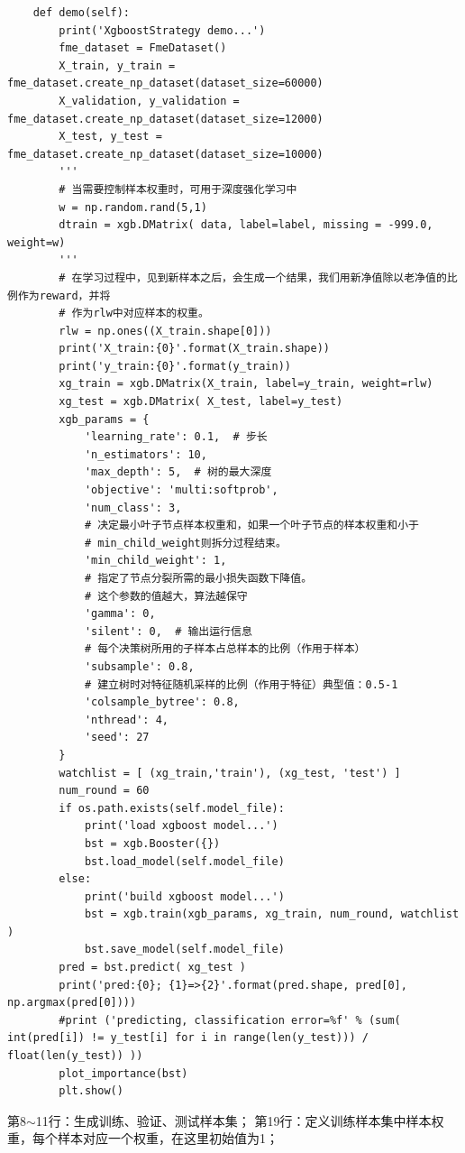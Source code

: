 \documentclass{article}
\begin{document}
\begin{lstlisting}
    def demo(self):
        print('XgboostStrategy demo...')
        fme_dataset = FmeDataset()
        X_train, y_train = fme_dataset.create_np_dataset(dataset_size=60000)
        X_validation, y_validation = fme_dataset.create_np_dataset(dataset_size=12000)
        X_test, y_test = fme_dataset.create_np_dataset(dataset_size=10000)
        '''
        # 当需要控制样本权重时，可用于深度强化学习中
        w = np.random.rand(5,1)
        dtrain = xgb.DMatrix( data, label=label, missing = -999.0, weight=w)
        '''
        # 在学习过程中，见到新样本之后，会生成一个结果，我们用新净值除以老净值的比例作为reward，并将
        # 作为rlw中对应样本的权重。
        rlw = np.ones((X_train.shape[0]))
        print('X_train:{0}'.format(X_train.shape))
        print('y_train:{0}'.format(y_train))
        xg_train = xgb.DMatrix(X_train, label=y_train, weight=rlw)
        xg_test = xgb.DMatrix( X_test, label=y_test)
        xgb_params = {
            'learning_rate': 0.1,  # 步长
            'n_estimators': 10,
            'max_depth': 5,  # 树的最大深度
            'objective': 'multi:softprob',
            'num_class': 3,
            # 决定最小叶子节点样本权重和，如果一个叶子节点的样本权重和小于
            # min_child_weight则拆分过程结束。
            'min_child_weight': 1, 
            # 指定了节点分裂所需的最小损失函数下降值。
            # 这个参数的值越大，算法越保守 
            'gamma': 0,  
            'silent': 0,  # 输出运行信息
            # 每个决策树所用的子样本占总样本的比例（作用于样本）
            'subsample': 0.8,  
            # 建立树时对特征随机采样的比例（作用于特征）典型值：0.5-1
            'colsample_bytree': 0.8,  
            'nthread': 4,
            'seed': 27
        }
        watchlist = [ (xg_train,'train'), (xg_test, 'test') ]
        num_round = 60
        if os.path.exists(self.model_file):
            print('load xgboost model...')
            bst = xgb.Booster({})
            bst.load_model(self.model_file)
        else:
            print('build xgboost model...')
            bst = xgb.train(xgb_params, xg_train, num_round, watchlist )
            bst.save_model(self.model_file)
        pred = bst.predict( xg_test )
        print('pred:{0}; {1}=>{2}'.format(pred.shape, pred[0], np.argmax(pred[0])))
        #print ('predicting, classification error=%f' % (sum( int(pred[i]) != y_test[i] for i in range(len(y_test))) / float(len(y_test)) ))
        plot_importance(bst)
        plt.show()
\end{lstlisting}
第8$\sim$11行：生成训练、验证、测试样本集；
第19行：定义训练样本集中样本权重，每个样本对应一个权重，在这里初始值为1；
\end{document}
